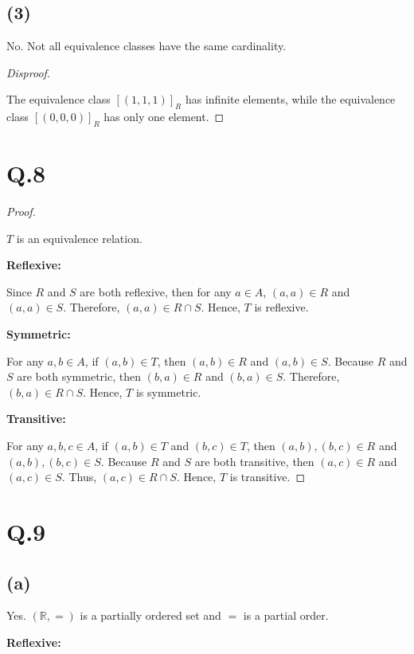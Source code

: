 \documentclass[a4paper,12pt]{article}
\begin{document}
\subsection*{(3)}

No. Not all equivalence classes have the same cardinality.

\begin{proof}[Disproof]
$ $ 

The equivalence class $[(1, 1, 1)]_R$ has infinite elements, while the equivalence class $[(0, 0, 0)]_R$ has only one element.
\end{proof}

\section*{Q.8}

\begin{proof}
$ $

$T$ is an equivalence relation.

\textbf{Reflexive:}

Since $R$ and $S$ are both reflexive, then for any $a \in A$, $(a, a) \in R$ and $(a, a) \in S$.
Therefore, $(a, a) \in R \cap S$.
Hence, $T$ is reflexive.

\textbf{Symmetric:}

For any $a, b \in A$, if $(a, b) \in T$, then $(a, b) \in R$ and $(a, b) \in S$.
Because $R$ and $S$ are both symmetric, then $(b, a) \in R$ and $(b, a) \in S$.
Therefore, $(b, a) \in R \cap S$.
Hence, $T$ is symmetric.

\textbf{Transitive:}

For any $a, b, c \in A$, if $(a, b) \in T$ and $(b, c) \in T$, then $(a, b), (b, c) \in R$ and $(a, b), (b, c) \in S$.
Because $R$ and $S$ are both transitive, then $(a, c) \in R$ and $(a, c) \in S$.
Thus, $(a, c) \in R \cap S$.
Hence, $T$ is transitive.
\end{proof}

\section*{Q.9}

\subsection*{(a)}

Yes. 
$(\mathbb{R}, =)$ is a partially ordered set and $=$ is a partial order.

\textbf{Reflexive:}
\end{document}
